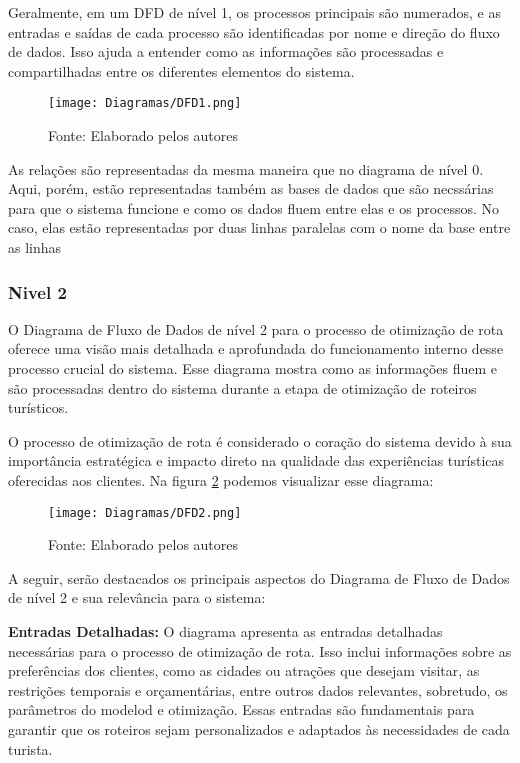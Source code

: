 Geralmente, em um DFD de nível 1, os processos principais são numerados, e as entradas e saídas de cada processo são identificadas por nome e direção do fluxo de dados. Isso ajuda a entender como as informações são processadas e compartilhadas entre os diferentes elementos do sistema.

\begin{figure}[H]
    \centering
    \caption{Diagrama Fluxo de Dados - Nível 1}
    \label{fig:DFD1}
    \texttt{[image: Diagramas/DFD1.png]}\\
    \caption*{Fonte: Elaborado pelos autores}
\end{figure}

As relações são representadas da mesma maneira que no diagrama de nível 0. Aqui, porém, estão representadas também as bases de dados que são necssárias para que o sistema funcione e como os dados fluem entre elas e os processos. No caso, elas estão representadas por duas linhas paralelas com o nome da base entre as linhas


\subsubsection{Nivel 2}

O Diagrama de Fluxo de Dados de nível 2 para o processo de otimização de rota oferece uma visão mais detalhada e aprofundada do funcionamento interno desse processo crucial do sistema. Esse diagrama mostra como as informações fluem e são processadas dentro do sistema durante a etapa de otimização de roteiros turísticos.

O processo de otimização de rota é considerado o coração do sistema devido à sua importância estratégica e impacto direto na qualidade das experiências turísticas oferecidas aos clientes.  Na figura \ref{fig:DFD2} podemos visualizar esse diagrama:

\begin{figure}[H]
    \centering
    \caption{Diagrama Fluxo de Dados - Nível 2}
    \label{fig:DFD2}
    \texttt{[image: Diagramas/DFD2.png]}\\
    \caption*{Fonte: Elaborado pelos autores}
\end{figure}

A seguir, serão destacados os principais aspectos do Diagrama de Fluxo de Dados de nível 2 e sua relevância para o sistema:

    \textbf{Entradas Detalhadas:} O diagrama apresenta as entradas detalhadas necessárias para o processo de otimização de rota. Isso inclui informações sobre as preferências dos clientes, como as cidades ou atrações que desejam visitar, as restrições temporais e orçamentárias, entre outros dados relevantes, sobretudo, os parâmetros do modelod e otimização. Essas entradas são fundamentais para garantir que os roteiros sejam personalizados e adaptados às necessidades de cada turista.


